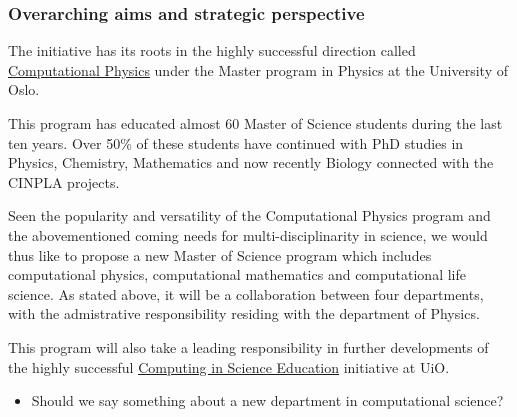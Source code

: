 \documentclass{beamer}
\begin{document}
\begin{frame}
\frametitle{Overarching aims and strategic perspective}

\begin{block}{}

The initiative has its roots in the highly successful direction called \href{{http://www.uio.no/english/studies/programmes/physics-master/programme-options/computational/index.html}}{Computational Physics}
under the Master program in Physics at the University of Oslo.

This program has educated almost 60 Master of Science students during the last ten years.
Over 50\% of these students have continued with PhD studies in Physics, Chemistry, Mathematics and
now recently Biology connected with the CINPLA projects. 

Seen the popularity and versatility of the Computational Physics program and the abovementioned coming needs for multi-disciplinarity in science, we would thus like to propose a new Master of Science program which includes computational physics, computational mathematics and computational life science. As stated above, it will be a collaboration between four departments, with the admistrative responsibility residing with the department of Physics. 

This program will also take a leading responsibility in further
developments of the highly successful \href{{http://www.mn.uio.no/english/about/collaboration/cse/}}{Computing in Science Education} initiative at UiO. 

\begin{itemize}
\item Should we say something about a new department in computational science?
\end{itemize}

\noindent
\end{block}
\end{frame}
\end{document}

